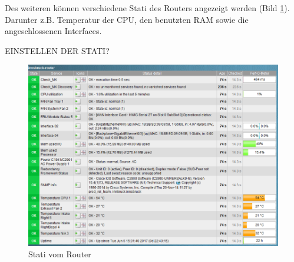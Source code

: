 Des weiteren können verschiedene Stati des Routers angezeigt werden (Bild \ref{img:router_monitoring}). Darunter z.B. Temperatur der CPU, den benutzten RAM sowie die angeschlossenen Interfaces.

EINSTELLEN DER STATI?

\begin{figure}[H]
	\centering
	\includegraphics[scale=0.59]{img/checkmk_router.PNG}
	\caption{Stati vom Router}
	\label{img:router_monitoring}
\end{figure}